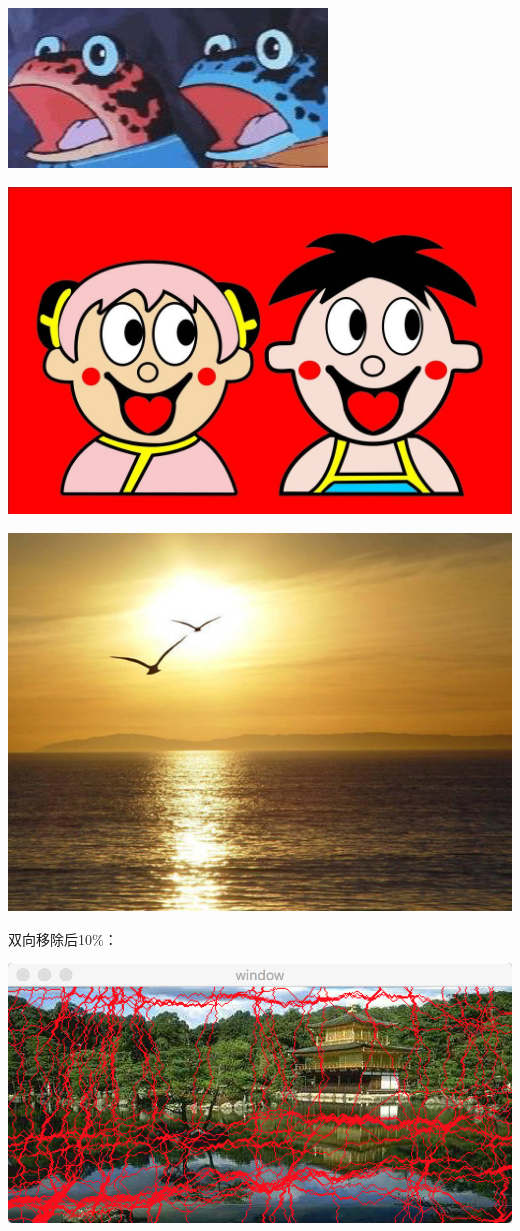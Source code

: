 \documentclass[10pt, a4paper]{article}
\begin{document}
    \includegraphics[scale = .3]{hhh.jpg}

    \includegraphics[scale = .3]{666.bmp}

    \includegraphics[scale = .3]{ori.jpg}

    双向移除后10$\%$：

    \includegraphics[scale = .3]{inputsobelseam.png}
\end{document}
